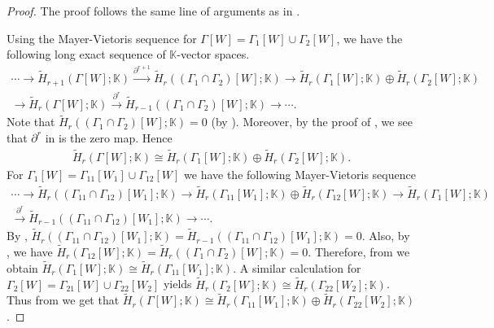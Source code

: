 \documentclass[12pt,reqno]{amsart}
\theoremstyle{definition}
\newcommand{\K}{\mathbb K}
\begin{document}
\begin{proof}
The proof follows the same line of arguments as in .

Using the Mayer-Vietoris sequence for $\Gamma[W]=\Gamma_1[W]\cup\Gamma_2[W]$, we have the following long exact sequence of $\mathbb K$-vector spaces.
{\footnotesize
    \begin{equation}\label{eq6}
    \begin{split}
        \cdots \rightarrow \widetilde H_{r+1}(\Gamma[W];\K)\xrightarrow{\partial^{r+1}} \widetilde H_{r}((\Gamma_1\cap\Gamma_2)[W];\K)\rightarrow \widetilde H_{r}(\Gamma_1[W];\K)\oplus \widetilde H_{r}(\Gamma_2[W];\K) \\
        \rightarrow \widetilde H_{r}(\Gamma[W];\K)\xrightarrow{\partial^{r}} \widetilde H_{r-1}((\Gamma_1\cap\Gamma_2)[W];\K)\rightarrow\cdots.
    \end{split}
    \end{equation}}      
Note that $\widetilde H_{r}((\Gamma_1\cap\Gamma_2)[W];\K)=0$ (by ). Moreover, by the proof of , we see that $\partial^r$ in  is the zero map. Hence
{\footnotesize
\begin{align}\label{eq7}
    \widetilde H_{r}(\Gamma[W];\K)\cong \widetilde H_{r}(\Gamma_1[W];\K)\oplus \widetilde H_{r}(\Gamma_2[W];\K).
\end{align}}
For $\Gamma_1[W]=\Gamma_{11}[W_1]\cup\Gamma_{12}[W]$ we have the following Mayer-Vietoris sequence
{\footnotesize
\begin{equation}\label{eq8}
    \begin{split}
        \cdots \rightarrow \widetilde H_{r}((\Gamma_{11}\cap\Gamma_{12})[W_1];\K)\rightarrow \widetilde H_{r}(\Gamma_{11}[W_1];\K)\oplus \widetilde H_{r}(\Gamma_{12}[W];\K)
        \rightarrow \widetilde H_{r}(\Gamma_1[W];\K)\\
        \xrightarrow{\partial^{r}} \widetilde H_{r-1}((\Gamma_{11}\cap\Gamma_{12})[W_1];\K)\rightarrow\cdots.
    \end{split}
    \end{equation}}
    By , $\widetilde H_{r}((\Gamma_{11}\cap\Gamma_{12})[W_1];\K)=\widetilde H_{r-1}((\Gamma_{11}\cap\Gamma_{12})[W_1];\K)=0$. Also, by , we have $\widetilde H_{r}(\Gamma_{12}[W];\K)=\widetilde H_{r}((\Gamma_{1}\cap\Gamma_2)[W];\K)=0$. Therefore, from  we obtain $\widetilde H_{r}(\Gamma_1[W];\K)\cong \widetilde H_{r}(\Gamma_{11}[W_1];\K)$. A similar calculation for $\Gamma_2[W]=\Gamma_{21}[W]\cup\Gamma_{22}[W_2]$ yields $\widetilde H_{r}(\Gamma_2[W];\K)\cong \widetilde H_{r}(\Gamma_{22}[W_2];\K)$. Thus from  we get that $\widetilde H_{r}(\Gamma[W];\K)\cong \widetilde H_{r}(\Gamma_{11}[W_1];\K)\oplus \widetilde H_{r}(\Gamma_{22}[W_2];\K)$.


\end{proof}
\end{document}
